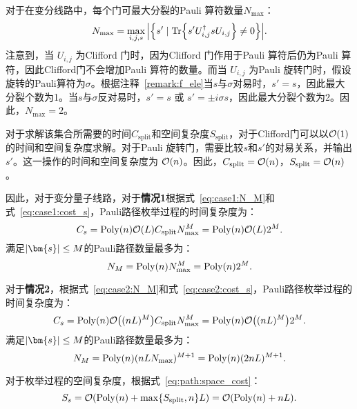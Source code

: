 对于在变分线路中，每个门可最大分裂的Pauli 算符数量$N_{\max}$：
\begin{equation}
    N_{\text{max}} = \max_{i,j,s}\abs{ \left\{ s'\mid \Tr{s' U^\dagger_{i,j}s U_{i,j}}\neq 0 \right\}}.
\end{equation}
注意到，当 $U_{i,j}$ 为Clifford 门时，因为Clifford 门作用于Pauli 算符后仍为Pauli 算符，因此Clifford门不会增加Pauli 算符的数量。而当 $U_{i,j}$ 为Pauli 旋转门时，假设旋转的Pauli算符为$\sigma$。根据注释~\ref{remark:f_ele}当$s$与$\sigma$对易时，$s'=s$，因此最大分裂个数为1。当$s$与$\sigma$反对易时，$s'=s$ 或 $s'=\pm i \sigma s$，因此最大分裂个数为2。因此，$N_{\text{max}}=2$。

对于求解该集合所需要的时间$C_{\text{split}}$和空间复杂度$S_{\text{split}}$，对于Clifford门可以以$\order{1}$的时间和空间复杂度求解。对于Pauli 旋转门，需要比较$s$和$s'$的对易关系，并输出$s'$。这一操作的时间和空间复杂度为 $\order{n}$。因此，$C_{\text{split}}=\order{n}$，$S_{\text{split}}=\order{n}$。

因此，对于变分量子线路，对于\textbf{情况1}根据式~\eqref{eq:case1:N_M}和式~\eqref{eq:case1:cost_s}，Pauli路径枚举过程的时间复杂度为：
\begin{equation}
    C_{s}=\mathrm{Poly}(n) \order{L} C_{\text{split}} N_{\text{max}}^{M}= \mathrm{Poly}(n) \order{L} 2^M.
\end{equation}
满足$\abs{\bm{s}}\leq M$的Pauli路径数量最多为：
\begin{equation}
    N_M=\text{Poly}(n) N_{\text{max}}^{M}=\text{Poly}(n) 2^M.
\end{equation}

对于\textbf{情况2}，根据式~\eqref{eq:case2:N_M}和式~\eqref{eq:case2:cost_s}，Pauli路径枚举过程的时间复杂度为：
\begin{equation}
    C_{s}=\mathrm{Poly}(n) \order{(nL)^M} C_{\text{split}} N_{\text{max}}^{M}= \mathrm{Poly}(n) \order{(nL)^M} 2^M.
\end{equation}
满足$\abs{\bm{s}}\leq M$的Pauli路径数量最多为：
\begin{equation}
    N_M=\text{Poly}(n)(nLN_{\text{max}})^{M+1}= \text{Poly}(n)(2nL)^{M+1}.
\end{equation}

对于枚举过程的空间复杂度，根据式~\eqref{eq:path:space_cost}：
\begin{equation}
    S_{s}=\order{\mathrm{Poly}(n)+\max\{S_{\text{split}},n\}L}=\order{\mathrm{Poly}(n)+nL}.
\end{equation}


